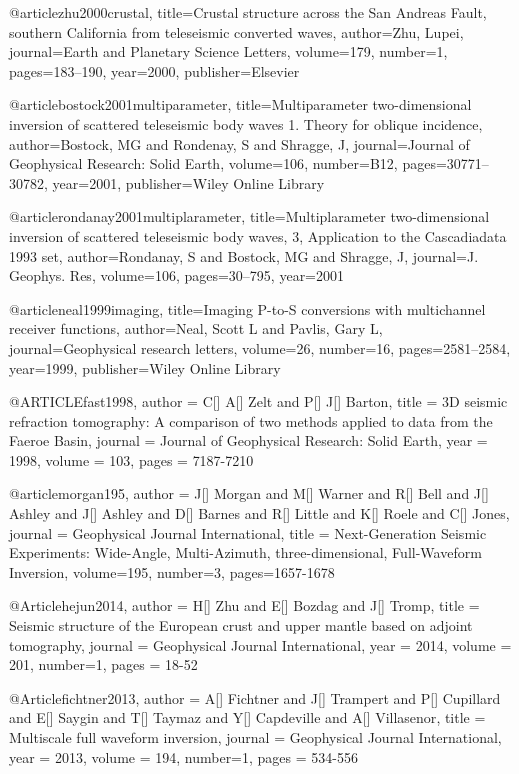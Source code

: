 @article{zhu2000crustal,
  title={Crustal structure across the San Andreas Fault, southern California from teleseismic converted waves},
  author={Zhu, Lupei},
  journal={Earth and Planetary Science Letters},
  volume={179},
  number={1},
  pages={183--190},
  year={2000},
  publisher={Elsevier}
}

@article{bostock2001multiparameter,
  title={Multiparameter two-dimensional inversion of scattered teleseismic body waves 1. Theory for oblique incidence},
  author={Bostock, MG and Rondenay, S and Shragge, J},
  journal={Journal of Geophysical Research: Solid Earth},
  volume={106},
  number={B12},
  pages={30771--30782},
  year={2001},
  publisher={Wiley Online Library}
}


@article{rondanay2001multiplarameter,
  title={Multiplarameter two-dimensional inversion of scattered teleseismic body waves, 3, Application to the Cascadiadata 1993 set},
  author={Rondanay, S and Bostock, MG and Shragge, J},
  journal={J. Geophys. Res},
  volume={106},
  pages={30--795},
  year={2001}
}



@article{neal1999imaging,
  title={Imaging P-to-S conversions with multichannel receiver functions},
  author={Neal, Scott L and Pavlis, Gary L},
  journal={Geophysical research letters},
  volume={26},
  number={16},
  pages={2581--2584},
  year={1999},
  publisher={Wiley Online Library}
}



@ARTICLE{fast1998,
  author = {C[] A[] Zelt and P[] J[] Barton},
  title = {3D seismic refraction tomography: A comparison of two methods applied to data from the Faeroe Basin},
  journal = {Journal of Geophysical Research: Solid Earth},
  year = {1998},
  volume = {103},
  pages = {7187-7210}
}


@article{morgan195,
author = {J[] Morgan and M[] Warner and R[] Bell and J[] Ashley and J[] Ashley and D[] Barnes and R[] Little and K[] Roele and C[] Jones},
journal = {Geophysical Journal International},
title = {Next-Generation Seismic Experiments: Wide-Angle, Multi-Azimuth, three-dimensional, Full-Waveform Inversion},
volume=195,
number=3,
pages=1657-1678
}

@Article{hejun2014,
  author = 	 {H[] Zhu and E[] Bozdag and J[] Tromp},
  title = 	 {Seismic structure of the European crust and upper mantle based on adjoint tomography},
  journal = 	 {Geophysical Journal International},
  year = 	 2014,
  volume = 201,
  number=1,
  pages =	 {18-52}
}

@Article{fichtner2013,
  author = 	 {A[] Fichtner and J[] Trampert and P[] Cupillard and E[] Saygin and T[] Taymaz and Y[] Capdeville and A[] Villasenor},
  title = 	 {Multiscale full waveform inversion},
  journal = 	 {Geophysical Journal International},
  year = 	 2013,
  volume = 194,
  number=1,
  pages =	 {534-556}
}

